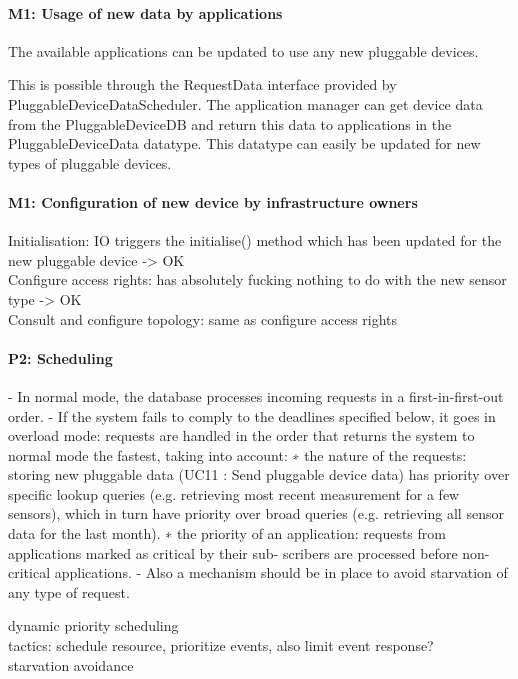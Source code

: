     \paragraph{M1: Usage of new data by applications}
        The available applications can be updated to use any new pluggable devices.

        This is possible through the RequestData interface provided by PluggableDeviceDataScheduler.
        The application manager can get device data from the PluggableDeviceDB and return this
        data to applications in the PluggableDeviceData datatype. This datatype can easily be
        updated for new types of pluggable devices.

    \paragraph{M1: Configuration of new device by infrastructure owners}
        Initialisation: IO triggers the initialise() method which has been
        updated for the new pluggable device -> OK\\
        Configure access rights: has absolutely fucking nothing to do with the
        new sensor type -> OK \\
        Consult and configure topology: same as configure access rights

    \paragraph{P2: Scheduling}
        - In normal mode, the database processes incoming requests in a first-in-first-out order.
        - If the system fails to comply to the deadlines specified below, it goes in overload mode: requests
            are handled in the order that returns the system to normal mode the fastest, taking into
            account:
            ∗ the nature of the requests: storing new pluggable data (UC11 : Send pluggable device
            data) has priority over specific lookup queries (e.g. retrieving most recent measurement
            for a few sensors), which in turn have priority over broad queries (e.g. retrieving all sensor
            data for the last month).
            ∗ the priority of an application: requests from applications marked as critical by their sub-
            scribers are processed before non-critical applications.
        - Also a mechanism should be in place to avoid starvation of any type of request.

        dynamic priority scheduling \\
        tactics: schedule resource, prioritize events, also limit event response?\\
        starvation avoidance

